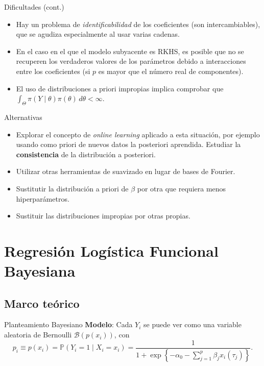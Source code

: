 \documentclass[10pt, english, professionalfonts]{beamer}
\begin{document}
\begin{frame}{Dificultades (cont.)}
  \begin{itemize}
    \item Hay un problema de \textit{identificabilidad} de los coeficientes (son intercambiables), que se agudiza especialmente al usar varias cadenas.
    \item En el caso en el que el modelo subyacente es RKHS, es posible que no se recuperen los verdaderos valores de los parámetros debido a interacciones entre los coeficientes (si \(p\) es mayor que el número real de componentes).
    \item El uso de distribuciones a priori impropias implica comprobar que \(\int_{\Theta} \pi(Y\mid \theta)\pi(\theta)\, d\theta < \infty\).
  \end{itemize}
\end{frame}

\begin{frame}{Alternativas}
  \begin{itemize}
    \item Explorar el concepto de \textit{online learning} aplicado a esta situación, por ejemplo usando como priori de nuevos datos la posteriori aprendida. Estudiar la \textbf{consistencia} de la distribución a posteriori.
    \item Utilizar otras herramientas de suavizado en lugar de bases de Fourier.
    \item Sustitutir la distribución a priori de \(\beta\) por otra que requiera menos hiperparámetros.
    \item Sustituir las distribuciones impropias por otras propias.
  \end{itemize}

\end{frame}

\section{Regresión Logística Funcional Bayesiana}

\subsection{Marco teórico}

\begin{frame}{Planteamiento Bayesiano}
\textbf{Modelo}: Cada \(Y_i\) se puede ver como una variable aleatoria de Bernoulli \(\mathcal B(p(x_i))\), con
\[
p_i \equiv p(x_i)=\mathbb P(Y_i=1\mid X_i=x_i) = \frac{1}{1 + \exp\left\{-\alpha_0-\displaystyle\sum_{j=1}^p \beta_jx_i(\tau_j)\right\}}.
\]

\end{frame}
\end{document}
